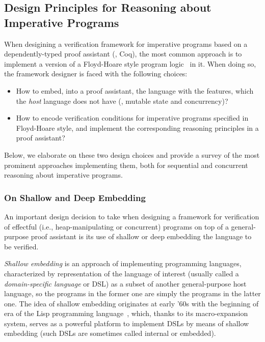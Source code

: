 
\subsection{Design Principles for Reasoning about Imperative Programs}
\label{sec:reas-about-imper}

When desigining a verification framework for imperative programs based on a dependently-typed
proof assistant (\eg, Coq), the most common approach is to implement a
version of a Floyd-Hoare style program
logic~\citep{Floyd1967Flowcharts,Hoare:CACM69} in it. When doing so,
the framework designer is faced with the following choices:

\begin{itemize}
\item How to embed, into a proof assistant, the language with the
  features, which the \emph{host} language does not have (\eg, mutable
  state and concurrency)?

\item How to encode verification conditions for imperative programs
  specified in Floyd-Hoare style, and implement the corresponding
  reasoning principles in a proof assistant?
\end{itemize}

\noindent
%
Below, we elaborate on these two design choices and provide a survey
of the most prominent approaches implementing them, both for
sequential and concurrent reasoning about imperative programs.

\subsubsection{On Shallow and Deep Embedding}
\label{sec:embedding}
An important design decision to take when designing a framework for
verification of effectful (i.e., heap-manipulating or concurrent)
programs on top of a general-purpose proof assistant is its use of
shallow or deep embedding the language to be verified.

\textit{Shallow embedding} is an approach of implementing programming
languages, characterized by representation of the language of interest
(usually called a \emph{domain-specific language} or DSL) as a subset
of another general-purpose host language, so the programs in the
former one are simply the programs in the latter one. The idea of
shallow embedding originates at early '60s with the beginning of era
of the Lisp programming language~\citep{Graham:BOOK}, which, thanks to
its macro-expansion system, serves as a powerful platform to implement
DSLs by means of shallow embedding (such DSLs are sometimes called
internal or embedded).

